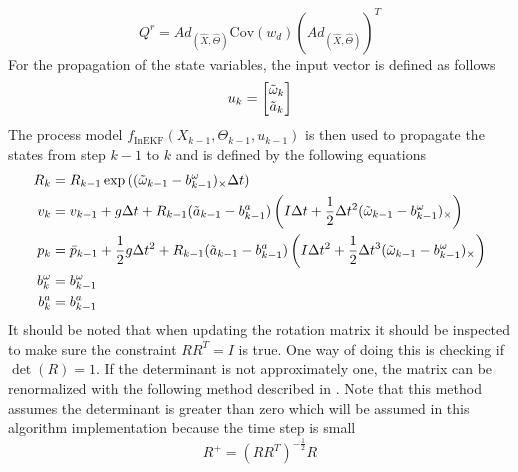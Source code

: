 \begin{equation}
    Q^r = Ad_{(\hat{X},\hat{\Theta})} \mathrm{Cov}(w_d) (Ad_{(\hat{X},\hat{\Theta})})^T
    \label{eq: Q RInEKF}
\end{equation}
For the propagation of the state variables, the input vector is defined as follows
\begin{equation}
        u_k = \begin{bmatrix}
            \Tilde{\omega}_k \\
             \Tilde{a}_k \\
        \end{bmatrix} 
    \label{eq: inputs IMU InEKF}
\end{equation}
The process model $f_\text{InEKF}(X_{k-1},\Theta_{k-1},u_{k-1})$ is then used to propagate the states from step $k-1$ to $k$ and is defined by the following equations
\begin{subequations}
    \label{eq: f InEKF}
    \begin{align}
        R_k &= R_{k-1} \exp{( (\Tilde{\omega}_{k-1} - b^{\omega}_{k-1})_{\times} \Delta t)}\\
        v_k &= v_{k-1} + g \Delta t + R_{k-1} (\Tilde{a}_{k-1} - b^{a}_{k-1}) 
        \left( I \Delta t + \frac{1}{2} \Delta t^2 (\Tilde{\omega}_{k-1} - b^{\omega}_{k-1})_{\times} \right) \label{eq:v for f InEKF} \\
        p_k &= \bar{p}_{k-1} + \frac{1}{2} g \Delta t^2 + R_{k-1} (\Tilde{a}_{k-1} - b^{a}_{k-1}) 
        \left( I \Delta t^2 + \frac{1}{2} \Delta t^3 (\Tilde{\omega}_{k-1} - b^{\omega}_{k-1})_{\times} \right) \label{eq:p for f InEKF} \\
        b^{\omega}_{k} &= b^{\omega}_{k-1} \label{eq:b^(omega) for f InEKF}\\
        b^{a}_{k} &= b^{a}_{k-1} \label{eq:b^a for f InEKF} 
    \end{align}
\end{subequations}
It should be noted that when updating the rotation matrix it should be inspected to make sure the constraint $R R^T = I$ is true. One way of doing this is checking if $\operatorname{det} (R)=1$. If the determinant is not approximately one, the matrix can be renormalized with the following method described in \cite{green1952orthogonal}. Note that this method assumes the determinant is greater than zero which will be assumed in this algorithm implementation because the time step is small
\begin{equation}
    R^+ = (R R^T)^{- \frac{1}{2}} R
    \label{eq: normalize R}
\end{equation}


